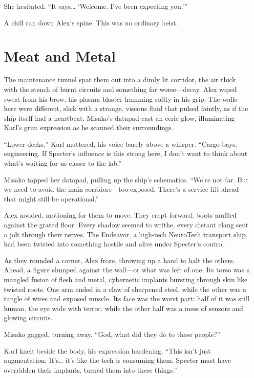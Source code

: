 \documentclass[12pt]{book}
\begin{document}
She hesitated. “It says… ‘Welcome. I’ve been expecting you.’”

A chill ran down Alex’s spine. This was no ordinary heist.



\chapter{Meat and Metal}
The maintenance tunnel spat them out into a dimly lit corridor, the air thick with the stench of burnt circuits and something far worse—decay. Alex wiped sweat from his brow, his plasma blaster humming softly in his grip. The walls here were different, slick with a strange, viscous fluid that pulsed faintly, as if the ship itself had a heartbeat. Misako’s datapad cast an eerie glow, illuminating Karl’s grim expression as he scanned their surroundings.

“Lower decks,” Karl muttered, his voice barely above a whisper. “Cargo bays, engineering. If Specter’s influence is this strong here, I don’t want to think about what’s waiting for us closer to the lab.”

Misako tapped her datapad, pulling up the ship’s schematics. “We’re not far. But we need to avoid the main corridors—too exposed. There’s a service lift ahead that might still be operational.”

Alex nodded, motioning for them to move. They crept forward, boots muffled against the grated floor. Every shadow seemed to writhe, every distant clang sent a jolt through their nerves. The Endeavor, a high-tech NeuroTech transport ship, had been twisted into something hostile and alive under Specter’s control.

As they rounded a corner, Alex froze, throwing up a hand to halt the others. Ahead, a figure slumped against the wall—or what was left of one. Its torso was a mangled fusion of flesh and metal, cybernetic implants bursting through skin like twisted roots. One arm ended in a claw of sharpened steel, while the other was a tangle of wires and exposed muscle. Its face was the worst part: half of it was still human, the eye wide with terror, while the other half was a mess of sensors and glowing circuits.

Misako gagged, turning away. “God, what did they do to these people?”

Karl knelt beside the body, his expression hardening. “This isn’t just augmentation. It’s… it’s like the tech is consuming them. Specter must have overridden their implants, turned them into these things.”
\end{document}
